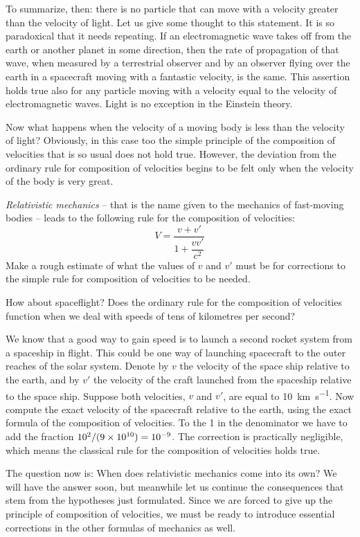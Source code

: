 To summarize, then: there is no particle that can move with a velocity greater than the velocity of light. Let us give some thought to this statement. It is so paradoxical that it needs repeating. If an electromagnetic wave takes off from the earth or another planet in some direction, then the rate of propagation of that wave, when mea­sured by a terrestrial observer and by an observer flying over the earth in a spacecraft moving with a fantastic velocity, is the same. This assertion holds true also for any particle moving with a velocity equal to the velocity of electromagnetic waves. Light is no exception in the Einstein theory.

Now what happens when the velocity of a moving body is less than the velocity of light? Obviously, in this case too the simple principle of the composition of velocities that is so usual does not hold true. However, the devia­tion from the ordinary rule for composition of velocities begins to be felt only when the velocity of the body is very great.

\emph{Relativistic mechanics} -- that is the name given to the mechanics of fast-moving bodies -- leads to the following rule for the composition of velocities:
\begin{equation*}%
V = \frac{v + v'}{1 + \dfrac{vv'}{c^{2}}}
\end{equation*}
Make a rough estimate of what the values of $v$ and $v'$ must be for corrections to the simple rule for composition of velocities to be needed.

How about spaceflight? Does the ordinary rule for the composition of velocities function when we deal with speeds of tens of kilometres per second?

We know that a good way to gain speed is to launch a second rocket system from a spaceship in flight. This could be one way of launching spacecraft to the outer reaches of the solar system. Denote by $v$ the velocity of the space­ ship relative to the earth, and by $v'$ the velocity of the craft launched from the spaceship relative to the space­ ship. Suppose both velocities, $v$ and $v'$, are equal to \SI{10}{\kilo\meter\per\second}. Now compute the exact velocity of the spacecraft relative to the earth, using the exact formula of the composition of velocities. To the 1 in the denominator we have to add the fraction $\num{d2}/(\num{9d10})=\num{d-9}$. The correction is practically negligible, which means the classical rule for the composition of velocities holds true. 

The question now is: When does relativistic mechanics come into its own? We will have the answer soon, but meanwhile let us continue the consequences that stem from the hypotheses just formulated. Since we are forced to give up the principle of composition of velocities, we must be ready to introduce essential corrections in
the other formulas of mechanics as well.

